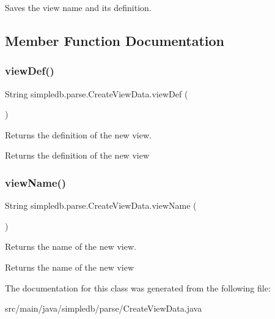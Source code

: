 Saves the view name and its definition. 

\subsection{Member Function Documentation}
\mbox{\label{classsimpledb_1_1parse_1_1CreateViewData_a30dd4744cd1fa08352bc21d152a98208}} 
\subsubsection{\texorpdfstring{view\+Def()}{viewDef()}}
{\footnotesize\ttfamily String simpledb.\+parse.\+Create\+View\+Data.\+view\+Def (\begin{DoxyParamCaption}{ }\end{DoxyParamCaption})\hspace{0.3cm}{\ttfamily [inline]}}

Returns the definition of the new view. \begin{DoxyReturn}{Returns}
the definition of the new view 
\end{DoxyReturn}
\mbox{\label{classsimpledb_1_1parse_1_1CreateViewData_a440e7e55b867ec68efbe3ec712de1e34}} 
\subsubsection{\texorpdfstring{view\+Name()}{viewName()}}
{\footnotesize\ttfamily String simpledb.\+parse.\+Create\+View\+Data.\+view\+Name (\begin{DoxyParamCaption}{ }\end{DoxyParamCaption})\hspace{0.3cm}{\ttfamily [inline]}}

Returns the name of the new view. \begin{DoxyReturn}{Returns}
the name of the new view 
\end{DoxyReturn}


The documentation for this class was generated from the following file\+:\begin{DoxyCompactItemize}
\item 
src/main/java/simpledb/parse/Create\+View\+Data.\+java\end{DoxyCompactItemize}
